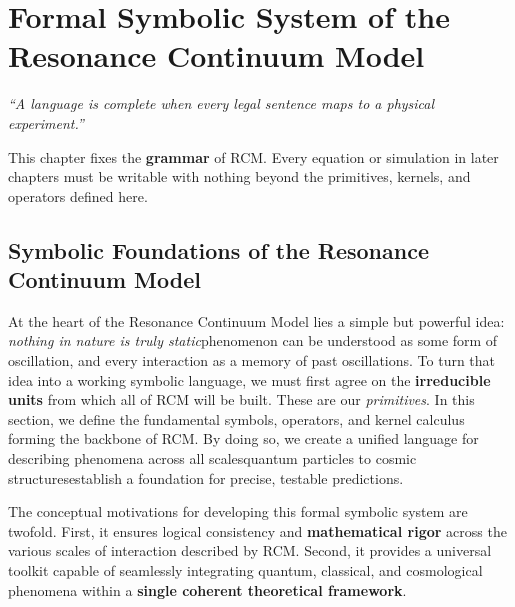\chapter{Formal Symbolic System of the Resonance Continuum Model}
\label{ch3:formal-symbolic-system-of-the-resonance-continuum-model}

\providecommand{\emdash}{\,\emdash\,}
\makeatletter{}\makeatother
\makeatletter{}\makeatother




\begin{center}
\emph{“A language is complete when every legal sentence maps to a physical experiment.”}
\end{center}

\begin{concept}
This chapter fixes the \textbf{grammar} of RCM.  
Every equation or simulation in later chapters must be writable with
nothing beyond the primitives, kernels, and operators defined here.
\end{concept}


\section{Symbolic Foundations of the Resonance Continuum Model}
\label{sec3:symbolic-foundations-of-the-resonance-continuum-model}
At the heart of the Resonance Continuum Model lies a simple but powerful idea: \emph{nothing in nature is truly static}\emdashevery phenomenon can be understood as some form of oscillation, and every interaction as a memory of past oscillations. To turn that idea into a working symbolic language, we must first agree on the \textbf{irreducible units} from which all of RCM will be built. These are our \emph{primitives}. In this section, we define the fundamental symbols, operators, and kernel calculus forming the backbone of RCM. By doing so, we create a unified language for describing phenomena across all scales\emdashfrom quantum particles to cosmic structures\emdashand establish a foundation for precise, testable predictions.

\begin{concept}
The conceptual motivations for developing this formal symbolic system are twofold. First, it ensures logical consistency and \textbf{mathematical rigor} across the various scales of interaction described by RCM. Second, it provides a universal toolkit capable of seamlessly integrating quantum, classical, and cosmological phenomena within a \textbf{single coherent theoretical framework}.
\end{concept}

